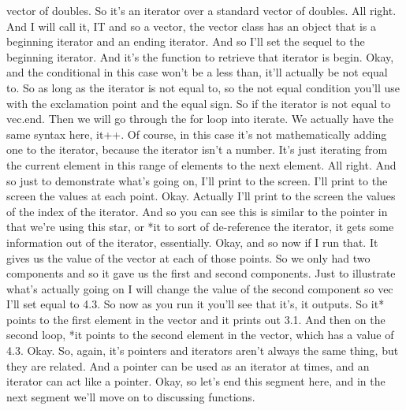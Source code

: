 \documentclass[10pt]{article}
\begin{document}
vector of doubles. So it's an iterator over a standard vector of doubles. All right. And I will call it, IT and so a vector, the vector class has an object that is a beginning iterator and an ending iterator. And so I'll set the sequel to the beginning iterator. And it's the function to retrieve that iterator is begin. Okay, and the conditional in this case won't be a less than, it'll actually be not equal to. So as long as the iterator is not equal to, so the not equal condition you'll use with the exclamation point and the equal sign. So if the iterator is not equal to vec.end. Then we will go through the for loop into iterate. We actually have the same syntax here, it++. Of course, in this case it's not mathematically adding one to the iterator, because the iterator isn't a number. It's just iterating from the current element in this range of elements to the next element. All right. And so just to demonstrate what's going on, I'll print to the screen. I'll print to the screen the values at each point. Okay. Actually I'll print to the screen the values of the index of the iterator. And so you can see this is similar to the pointer in that we're using this star, or *it to sort of de-reference the iterator, it gets some information out of the iterator, essentially. Okay, and so now if I run that. It gives us the value of the vector at each of those points. So we only had two components and so it gave us the first and second components. Just to illustrate what's actually going on I will change the value of the second component so vec I'll set equal to 4.3. So now as you run it you'll see that it's, it outputs. So it* points to the first element in the vector and it prints out 3.1. And then on the second loop, *it points to the second element in the vector, which has a value of 4.3. Okay. So, again, it's pointers and iterators aren't always the same thing, but they are related. And a pointer can be used as an iterator at times, and an iterator can act like a pointer. Okay, so let's end this segment here, and in the next segment we'll move on to discussing functions.
\end{document}
